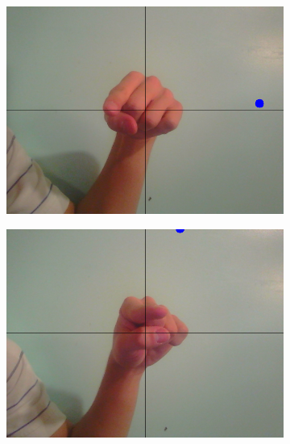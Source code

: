 \documentclass[10pt,twocolumn,letterpaper]{article}
\begin{document}
\begin{center}
\begin{figure}[t]
	\begin{center}
		\begin{subfigure}[b]{0.3\textwidth}
			\includegraphics[width=\textwidth]{figures/PointLeftImage.png}
			\caption{} %
			\label{fig:pointLeftImage}
		\end{subfigure}
		\begin{subfigure}[b]{0.3\textwidth}
			\includegraphics[width=\textwidth]{figures/PointRightImage.png}
			\caption{}
			\label{fig:pointRightImage}
		\end{subfigure}
		~\\

\end{center}
\end{figure}
\end{center}
\end{document}
